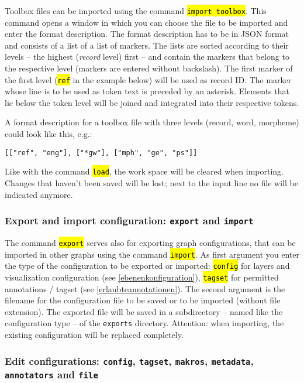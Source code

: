 \documentclass[12pt]{scrartcl}
\newcommand{\code}[1]{\hl{\texttt{#1}}}
\begin{document}
Toolbox files can be imported using the command \code{import toolbox}.
This command opens a window in which you can choose the file to be imported and enter the format description.
The format description has to be in JSON format and consists of a list of a list of markers.
The lists are sorted according to their levels – the highest (\textit{record} level) first – and contain the markers that belong to the respective level (markers are entered without backslash).
The first marker of the first level (\code{ref} in the example below) will be used as record ID.
The marker whose line is to be used as token text is preceded by an asterisk.
Elements that lie below the token level will be joined and integrated into their respective tokens.

A format description for a toolbox file with three levels (record, word, morpheme) could look like this, e.g.:

\begin{lstlisting}[gobble=4]
	[["ref", "eng"], ["*gw"], ["mph", "ge", "ps"]]
\end{lstlisting}

Like with the command \code{load}, the work space will be cleared when importing.
Changes that haven’t been saved will be lost; next to the input line no file will be indicated anymore.


\subsubsection{Export and import configuration: \texttt{export} and \texttt{import}}

The command \code{export} serves also for exporting graph configurations, that can be imported in other graphs using the command \code{import}.
As first argument you enter the type of the configuration to be exported or imported: \code{config} for layers and visualization configuration (see \ref{ebenenkonfiguration}), \code{tagset} for permitted annotations / tagset (see \ref{erlaubteannotationen}).
The second argument is the filename for the configuration file to be saved or to be imported (without file extension).
The exported file will be saved in a subdirectory – named like the configuration type – of the \texttt{exports} directory.
Attention: when importing, the existing configuration will be replaced completely.


\subsubsection{Edit configurations: \texttt{config}, \texttt{tagset}, \texttt{makros}, \texttt{metadata}, \texttt{annotators} and \texttt{file}}
\end{document}
